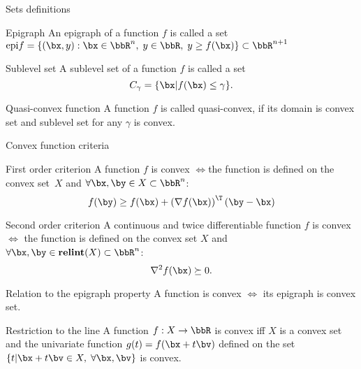 \documentclass[12pt]{beamer}
\begin{document}
\begin{frame}{Sets definitions}
\begin{block}{Epigraph}
An epigraph of a function $f$ is called a set $\text{epi}f = \{ (\bx, y) : \bx \in \bbR^n, \; y \in \bbR, \; y \geq f(\bx) \} \subset \bbR^{n+1}$
\end{block}

\begin{block}{Sublevel set}
A sublevel set of a function $f$ is called a set
\vspace{-4mm}
\[
C_{\gamma} = \{ \bx | f(\bx) \leq \gamma \}.
\]
\end{block}

\begin{block}{Quasi-convex function}
A function $f$ is called quasi-convex, if its domain is convex set and sublevel set for any $\gamma$ is convex. 
\end{block}
\end{frame}

\begin{frame}{Convex function criteria}
\footnotesize
\vspace{-2mm}
\begin{block}{First order criterion}
A function $f$ is convex $\Leftrightarrow$the function is defined on the convex set~$X$ and $\forall \bx, \by \in X \subset \bbR^n$:
\vspace{-4mm}
\[
f(\by) \geq f(\bx) + \left( \nabla f(\bx) \right)^{\T} (\by - \bx)
\]
\end{block}

\begin{block}{Second order criterion}
A continuous and twice differentiable function $f$ is convex $\Leftrightarrow$ the function is defined on the convex set $X$ and $\forall \bx, \by \in \textbf{relint}(X) \subset \bbR^n$:
\vspace{-2mm}
\[
\nabla^2 f(\bx) \succeq 0.
\]
\end{block}

\begin{block}{Relation to the epigraph property}
A function is convex $\Leftrightarrow$ its epigraph is convex set.
\end{block}

\begin{block}{Restriction to the line}
A function $f: X \rightarrow \bbR$ is convex iff $X$ is a convex set and the univariate function $g(t) = f(\bx + t\bv)$ defined on the set $\{ t | \bx + t\bv \in X, \; \forall \bx, \bv \}$ is convex.
\end{block}

\end{frame}
\end{document}
